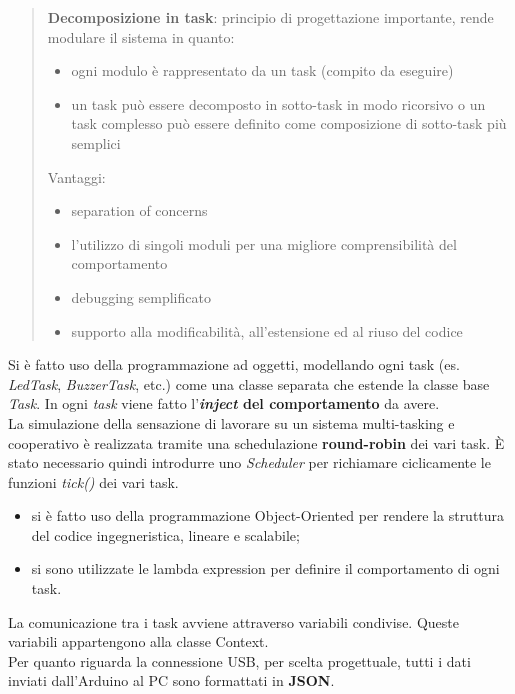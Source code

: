 	\begin{quote}
		\textbf{Decomposizione in task}: principio di progettazione importante, rende modulare il sistema in quanto:
		\begin{itemize}
			\item ogni modulo è rappresentato da un task (compito da eseguire)
			\item un task può essere decomposto in sotto-task in modo ricorsivo o un task complesso può essere definito come composizione di sotto-task più semplici
		\end{itemize}
		Vantaggi:
		\begin{itemize}
			\item separation of concerns
			\item l'utilizzo di singoli moduli per una migliore comprensibilità del comportamento
			\item debugging semplificato
			\item supporto alla modificabilità, all'estensione ed al riuso del codice
		\end{itemize}
	\end{quote}	
Si è fatto uso della programmazione ad oggetti, modellando ogni task (es. \textit{LedTask}, \textit{BuzzerTask}, etc.) come una classe separata che estende la classe base \textit{Task}. In ogni \textit{task} viene fatto l'\textbf{\textit{inject} del comportamento} da avere.\\
La simulazione della sensazione di lavorare su un sistema multi-tasking e cooperativo è realizzata tramite una schedulazione \textbf{round-robin} dei vari task. È stato necessario quindi introdurre uno \textit{Scheduler} per richiamare ciclicamente le funzioni \textit{tick()} dei vari task.

\begin{itemize}	
	\item si è fatto uso della programmazione Object-Oriented per rendere la struttura del codice ingegneristica, lineare e scalabile;
	\item si sono utilizzate le lambda expression per definire il comportamento di ogni task.
\end{itemize}
La comunicazione tra i task avviene attraverso variabili condivise. Queste variabili appartengono alla classe Context.\\
Per quanto riguarda la connessione USB, per scelta progettuale, tutti i dati inviati dall'Arduino al PC sono formattati in \textbf{JSON}.

